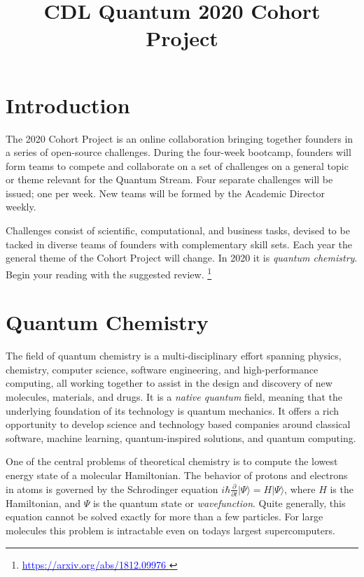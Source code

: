\documentclass[12pt]{article}
\title{CDL Quantum 2020 Cohort Project}
\begin{document}
\maketitle

\thispagestyle{empty}
\section{Introduction}

The 2020 Cohort Project is an online collaboration bringing together founders in a series of open-source challenges.
During the four-week bootcamp, founders will form teams to compete and collaborate on a set of challenges on a general topic or theme
relevant for the Quantum Stream.  Four separate challenges will be issued; one per week.  New teams will be formed by the Academic Director weekly.

Challenges consist of scientific, computational, and business tasks, devised to be tacked in diverse teams of founders with complementary skill sets.  Each year
the general theme of the Cohort Project will change.  In 2020 it is {\it quantum chemistry}.  Begin your reading with the suggested review.
\footnote{\href{https://arxiv.org/abs/1812.09976}{\textcolor{blue}{https://arxiv.org/abs/1812.09976} }}


\section{Quantum Chemistry}

The field of quantum chemistry is a multi-disciplinary effort spanning physics, chemistry, computer science, software engineering, and high-performance computing,
all working together to assist in the design and discovery of new molecules, materials, and drugs.  It is a {\it native quantum} field, meaning that the underlying
foundation of its technology is quantum mechanics. It offers a rich opportunity to develop science and technology 
based companies around classical software, machine learning, quantum-inspired solutions, and quantum computing.

One of the central problems of theoretical chemistry is to compute the lowest energy state of a molecular Hamiltonian. 
The behavior of protons and electrons in atoms is governed by the Schrodinger equation 
$i \hbar \frac{\partial }{ \partial t}  | \Psi \rangle = H | \Psi \rangle$, where $H$ is the Hamiltonian, and $\Psi$ is the quantum state or {\it wavefunction}.
Quite generally, this equation cannot be solved exactly for more than a few particles.  
For large molecules this problem is intractable even on todays largest supercomputers. 
\end{document}
